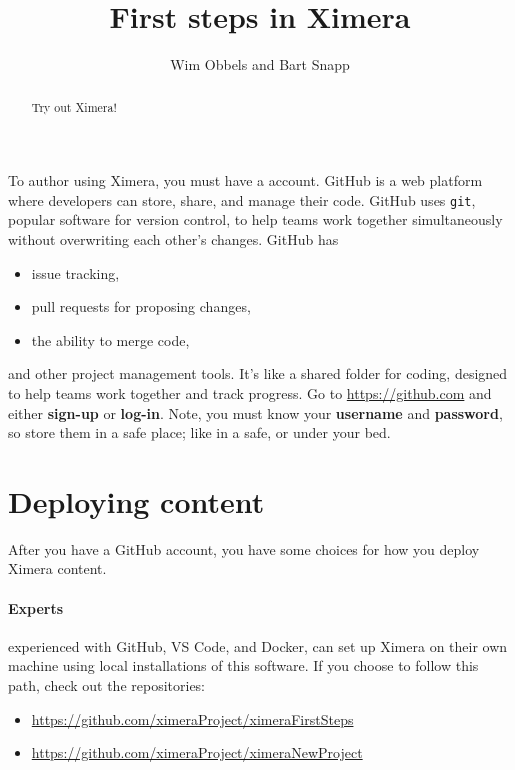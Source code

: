 \documentclass{ximera}
\author{Wim Obbels and Bart Snapp}
\title{First steps in Ximera}
\begin{document}
        \begin{abstract}
            Try out Ximera!
        \end{abstract}
        \maketitle

        To author using Ximera, you must have a 
        account. GitHub is a web platform where developers can store, share,
        and manage
        their code. GitHub uses \verb!git!, popular software for version control,
        to help
        teams work together simultaneously without overwriting each other's
        changes.
        GitHub has
        \begin{itemize}
            \item issue tracking,
            \item pull requests for proposing changes,
            \item the ability to merge code,
        \end{itemize}
        and other project management tools. It's like a shared folder for
        coding, designed to
        help teams work together and track progress. Go to
        \url{https://github.com} and
        either \textbf{sign-up} or \textbf{log-in}. Note, you must know your \textbf{username}
        and
        \textbf{password}, so store them in a safe place; like in a safe, or
        under your bed. 



        \section{Deploying content}
        After you have a GitHub account, you have some choices for how you deploy Ximera content.
        
\paragraph{Experts}  experienced with GitHub, VS Code, and Docker, can set up Ximera on
their own machine using local installations of this software. If you choose to follow this path, check out the repositories:
\begin{itemize}
    \item \url{https://github.com/ximeraProject/ximeraFirstSteps}
    \item \url{https://github.com/ximeraProject/ximeraNewProject}
\end{itemize}
\end{document}
